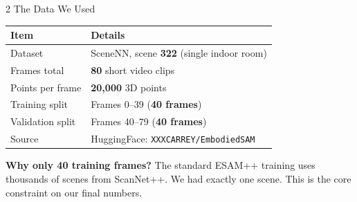 \documentclass[12pt,a4paper]{article}
\begin{document}
\vspace{10pt}

\begin{sectionbox}[mainblue]{2 \quad The Data We Used}

\begin{tabularx}{\linewidth}{lX}
\toprule
\textbf{Item} & \textbf{Details} \\
\midrule
Dataset & SceneNN, scene \textbf{322} (single indoor room) \\
Frames total & \textbf{80} short video clips \\
Points per frame & \textbf{20{,}000} 3D points \\
Training split & Frames 0–39 \quad(\textbf{40 frames}) \\
Validation split & Frames 40–79 \quad(\textbf{40 frames}) \\
Source & HuggingFace: \texttt{XXXCARREY/EmbodiedSAM} \\
\bottomrule
\end{tabularx}

\medskip
\begin{keybox}
  \textbf{Why only 40 training frames?} \quad
  The standard ESAM++ training uses thousands of scenes from ScanNet++.
  We had exactly one scene. This is the core constraint on our final numbers.
\end{keybox}

\end{sectionbox}

\vspace{10pt}
\end{document}
